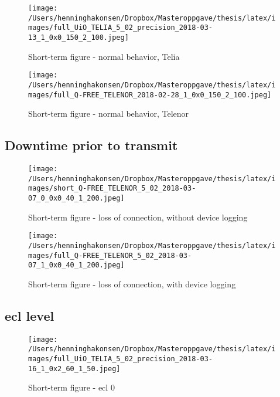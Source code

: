 \documentclass[USenglish]{ifimaster}  %
\begin{document}
\begin{figure}[H]
  \centering
  \texttt{[image: /Users/henninghakonsen/Dropbox/Masteroppgave/thesis/latex/images/full\_UiO\_TELIA\_5\_02\_precision\_2018-03-13\_1\_0x0\_150\_2\_100.jpeg]}
  \caption{Short-term figure - normal behavior, Telia}
  \label{figure:2x150_UIO_TELIA}
\end{figure}

\begin{figure}[H]
  \centering
  \texttt{[image: /Users/henninghakonsen/Dropbox/Masteroppgave/thesis/latex/images/full\_Q-FREE\_TELENOR\_2018-02-28\_1\_0x0\_150\_2\_100.jpeg]}
  \caption{Short-term figure - normal behavior, Telenor}
  \label{figure:2x150_QFREE_TELENOR}
\end{figure}

\subsection{Downtime prior to transmit} \label{ssection:downtimeprior}
\begin{figure}[H]
  \centering
  \texttt{[image: /Users/henninghakonsen/Dropbox/Masteroppgave/thesis/latex/images/short\_Q-FREE\_TELENOR\_5\_02\_2018-03-07\_0\_0x0\_40\_1\_200.jpeg]}
  \caption{Short-term figure - loss of connection, without device logging}
  \label{figure:1x40_QFREE_TELENOR_0LOG}
\end{figure}

\begin{figure}[H]
  \centering
  \texttt{[image: /Users/henninghakonsen/Dropbox/Masteroppgave/thesis/latex/images/full\_Q-FREE\_TELENOR\_5\_02\_2018-03-07\_1\_0x0\_40\_1\_200.jpeg]}
  \caption{Short-term figure - loss of connection, with device logging}
  \label{figure:1x40_QFREE_TELENOR_1LOG}
\end{figure}

\subsection{\acrshort{ecl} level} \label{ssection:ecllevel}
\begin{figure}[H]
  \centering
  \texttt{[image: /Users/henninghakonsen/Dropbox/Masteroppgave/thesis/latex/images/full\_UiO\_TELIA\_5\_02\_precision\_2018-03-16\_1\_0x2\_60\_1\_50.jpeg]}
  \caption{Short-term figure - \acrshort{ecl} 0}
  \label{figure:1x60_UIO_TELIA_ECL_0}
\end{figure}
\end{document}

